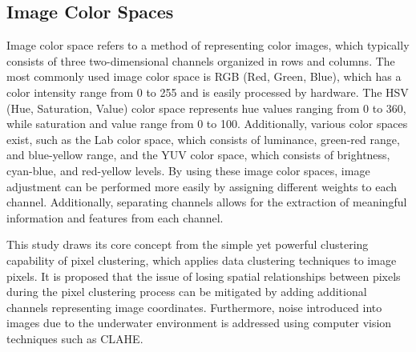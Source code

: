 \subsection{Image Color Spaces}
Image color space refers to a method of representing color images, which typically consists of three two-dimensional channels organized in rows and columns.
The most commonly used image color space is RGB (Red, Green, Blue), which has a color intensity range from 0 to 255 and is easily processed by hardware.
The HSV (Hue, Saturation, Value) color space represents hue values ranging from 0 to 360, while saturation and value range from 0 to 100.
Additionally, various color spaces exist, such as the Lab color space, which consists of luminance, green-red range, and blue-yellow range, and the YUV color space, which consists of brightness, cyan-blue, and red-yellow levels.
By using these image color spaces, image adjustment can be performed more easily by assigning different weights to each channel. Additionally, separating channels allows for the extraction of meaningful information and features from each channel.

This study draws its core concept from the simple yet powerful clustering capability of pixel clustering, which applies data clustering techniques to image pixels.
It is proposed that the issue of losing spatial relationships between pixels during the pixel clustering process can be mitigated by adding additional channels representing image coordinates.
Furthermore, noise introduced into images due to the underwater environment is addressed using computer vision techniques such as CLAHE.